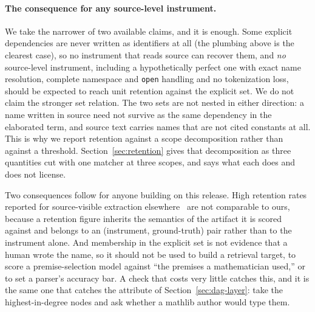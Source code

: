 \paragraph{The consequence for any source-level instrument.}
We take the narrower of two available claims, and it is enough. Some explicit
dependencies are never written as identifiers at all (the plumbing above is the
clearest case), so no instrument that reads source can recover them, and
\emph{no} source-level instrument, including a hypothetically perfect one with
exact name resolution, complete namespace and \texttt{open} handling and no
tokenization loss, should be expected to reach unit retention against the
explicit set. We do not claim the stronger set relation. The two sets are not
nested in either direction: a name written in source need not survive as the
same dependency in the elaborated term, and source text carries names that are
not cited constants at all. This is why we report retention against a scope
decomposition rather than against a threshold.
Section~\ref{sec:retention} gives that decomposition as three quantities cut
with one matcher at three scopes, and says what each does and does not
license.

Two consequences follow for anyone building on this release. High retention
rates reported for source-visible extraction elsewhere~\citep{cslibpremise} are
not comparable to ours, because a retention figure inherits the semantics of the
artifact it is scored against and belongs to an (instrument, ground-truth) pair
rather than to the instrument alone. And membership in the explicit set is not
evidence that a human wrote the name, so it should not be used to build a
retrieval target, to score a premise-selection model against ``the premises a
mathematician used,'' or to set a parser's accuracy bar. A check that costs
very little catches this, and it is the same one that catches the attribute of
Section~\ref{sec:dag-layer}: take the highest-in-degree nodes and ask whether a
mathlib author would type them.
